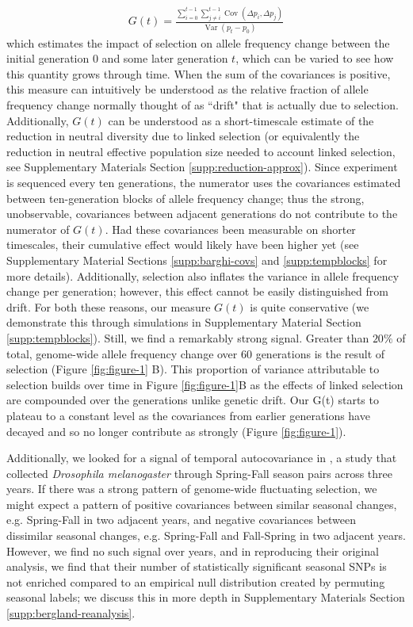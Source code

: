 \documentclass[11pt]{article}
\DeclareMathOperator{\var}{Var}
\DeclareMathOperator{\cov}{Cov}
\begin{document}
\begin{align}
  G(t) = \frac{ \sum_{i=0}^{t-1} \sum_{j \ne i}^{t-1} \cov(\Delta p_i, \Delta p_j)}{\var(p_t - p_0)}
\end{align}
%
which estimates the impact of selection on allele frequency change between
the initial generation $0$ and some later generation $t$, which can be varied
to see how this quantity grows through time. When the sum of the covariances is
positive, this measure can intuitively be understood as the relative fraction
of allele frequency change normally thought of as ``drift" that is actually due
to selection. Additionally, $G(t)$ can be understood as a short-timescale
estimate of the reduction in neutral diversity due to linked selection (or
equivalently the reduction in neutral effective population size needed to
account linked selection, see Supplementary Materials Section
\ref{supp:reduction-approx}). Since \textcite{Barghi2019-qy} experiment is
sequenced every ten generations, the numerator uses the covariances
  estimated between ten-generation blocks of allele frequency change; thus
  the strong, unobservable, covariances between adjacent generations do not
contribute to the numerator of $G(t)$. Had these covariances been measurable
on shorter timescales, their cumulative effect would likely have been higher
yet (see Supplementary Material Sections \ref{supp:barghi-covs} and
\ref{supp:tempblocks} for more details).  Additionally, selection also inflates
the variance in allele frequency change per generation; however, this effect
cannot be easily distinguished from drift. For both these reasons, our measure
$G(t)$ is quite conservative (we demonstrate this through
simulations in Supplementary Material Section \ref{supp:tempblocks}).  Still,
we find a remarkably strong signal. Greater than $20\%$ of total, genome-wide
allele frequency change over 60 generations is the result of selection (Figure
\ref{fig:figure-1} B). This proportion of variance attributable to selection
builds over time in Figure \ref{fig:figure-1}B as the effects of linked
selection are compounded over the generations unlike genetic drift. Our G(t)
starts to plateau to a constant level as the covariances from earlier
generations have decayed and so no longer contribute as strongly (Figure
\ref{fig:figure-1}).

Additionally, we looked for a signal of temporal autocovariance in
\textcite{Bergland2014-ij}, a study that collected \emph{Drosophila
melanogaster} through Spring-Fall season pairs across three years. If there was
a strong  pattern of genome-wide fluctuating selection, we might expect a
pattern of positive covariances between similar seasonal changes, e.g.
Spring-Fall in two adjacent years, and negative covariances between dissimilar
seasonal changes, e.g. Spring-Fall and Fall-Spring in two adjacent years.
However, we find no such signal over years, and in reproducing their original
analysis, we find that their number of statistically significant seasonal SNPs
is not enriched compared to an empirical null distribution created by permuting
seasonal labels; we discuss this in more depth in Supplementary Materials
Section \ref{supp:bergland-reanalysis}.
\end{document}
